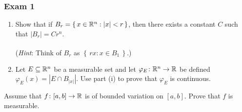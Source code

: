 \subsubsection{Exam 1}
\setcounter{exercise}{0}
\setcounter{equation}{0}


\begin{problem}
\end{problem}
\begin{solution}
\end{solution}

\begin{problem}
\end{problem}
\begin{solution}
\end{solution}

\begin{problem}
\hfill
\begin{enumerate}[label=(\roman*),noitemsep]
\item Show that if \(B_r=\left\{\, x \in\mathbb{R}^n:| x |<r\,\right\}\), then
  there exists a constant \(C\) such that \(|B_r|=Cr^n\).
  \\\\
  (\emph{Hint}: Think of \(B_r\) as
  \(\left\{\,r x : x \in B_1\,\right\}\).)
\item Let \(E\subseteq\mathbb{R}^n\) be a measurable set and let
  \(\varphi_E\colon\mathbb{R}^n\to\mathbb{R}\) be defined
  \(\varphi_E( x )=\left|E\cap B_{| x |}\right|\). Use part (i) to prove
  that \(\varphi_E\) is continuous.
\end{enumerate}
\end{problem}
\begin{solution}
\end{solution}

\begin{problem}
  Assume that \(f\colon[a,b]\to\mathbb{R}\) is of bounded variation on
  \([a,b]\). Prove that \(f\) is measurable.
\end{problem}
\begin{solution}
\end{solution}

